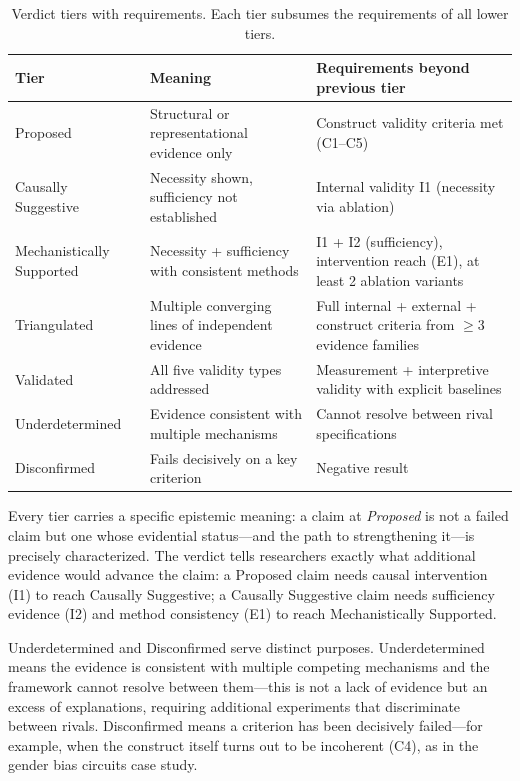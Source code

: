 \documentclass[10pt]{article}
\newcommand{\tighttable}{\setlength{\tabcolsep}{4pt}\renewcommand{\arraystretch}{1.05}}
\begin{document}
\begin{table}[H]
\centering
\tighttable
\caption{Verdict tiers with requirements. Each tier subsumes the requirements of all lower tiers.}
\label{tab:verdicts}
\small
\begin{tabular}{@{}lp{4.5cm}p{5.5cm}@{}}
\toprule
\textbf{Tier} & \textbf{Meaning} & \textbf{Requirements beyond previous tier} \\
\midrule
Proposed & Structural or representational evidence only & Construct validity criteria met (C1--C5) \\
\midrule
Causally Suggestive & Necessity shown, sufficiency not established & Internal validity I1 (necessity via ablation) \\
\midrule
Mechanistically Supported & Necessity + sufficiency with consistent methods & I1 + I2 (sufficiency), intervention reach (E1), at least 2 ablation variants \\
\midrule
Triangulated & Multiple converging lines of independent evidence & Full internal + external + construct criteria from $\geq 3$ evidence families \\
\midrule
Validated & All five validity types addressed & Measurement + interpretive validity with explicit baselines \\
\midrule
Underdetermined & Evidence consistent with multiple mechanisms & Cannot resolve between rival specifications \\
\midrule
Disconfirmed & Fails decisively on a key criterion & Negative result \\
\bottomrule
\end{tabular}
\end{table}

Every tier carries a specific epistemic meaning: a claim at \emph{Proposed} is not a failed claim but one whose evidential status---and the path to strengthening it---is precisely characterized. The verdict tells researchers exactly what additional evidence would advance the claim: a Proposed claim needs causal intervention (I1) to reach Causally Suggestive; a Causally Suggestive claim needs sufficiency evidence (I2) and method consistency (E1) to reach Mechanistically Supported.

Underdetermined and Disconfirmed serve distinct purposes. Underdetermined means the evidence is consistent with multiple competing mechanisms and the framework cannot resolve between them---this is not a lack of evidence but an excess of explanations, requiring additional experiments that discriminate between rivals. Disconfirmed means a criterion has been decisively failed---for example, when the construct itself turns out to be incoherent (C4), as in the gender bias circuits case study.
\end{document}
